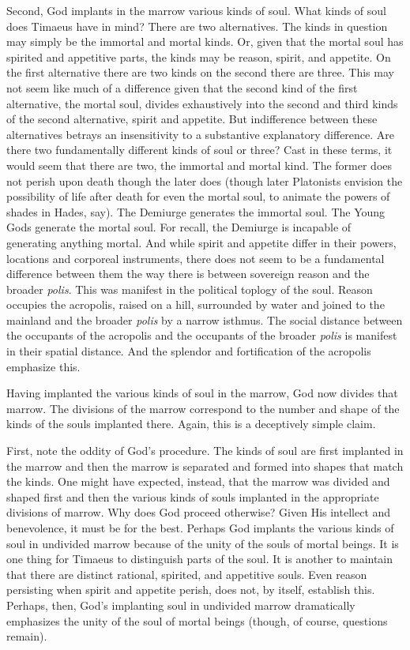 Second, God implants in the marrow various kinds of soul. What kinds of soul does Timaeus have in mind? There are two alternatives. The kinds in question may simply be the immortal and mortal kinds. Or, given that the mortal soul has spirited and appetitive parts, the kinds may be reason, spirit, and appetite. On the first alternative there are two kinds on the second there are three. This may not seem like much of a difference given that the second kind of the first alternative, the mortal soul, divides exhaustively into the second and third kinds of the second alternative, spirit and appetite. But indifference between these alternatives betrays an insensitivity to a substantive explanatory difference. Are there two fundamentally different kinds of soul or three? Cast in these terms, it would seem that there are two, the immortal and mortal kind. The former does not perish upon death though the later does (though later Platonists envision the possibility of life after death for even the mortal soul, to animate the powers of shades in Hades, say). The Demiurge generates the immortal soul. The Young Gods generate the mortal soul. For recall, the Demiurge is incapable of generating anything mortal. And while spirit and appetite differ in their powers, locations and corporeal instruments, there does not seem to be a fundamental difference between them the way there is between sovereign reason and the broader \emph{polis}. This was manifest in the political toplogy of the soul. Reason occupies the acropolis, raised on a hill, surrounded by water and joined to the mainland and the broader \emph{polis} by a narrow isthmus. The social distance between the occupants of the acropolis and the occupants of the broader \emph{polis} is manifest in their spatial distance. And the splendor and fortification of the acropolis emphasize this. 

Having implanted the various kinds of soul in the marrow, God now divides that marrow. The divisions of the marrow correspond to the number and shape of the kinds of the souls implanted there. Again, this is a deceptively simple claim.

First, note the oddity of God's procedure. The kinds of soul are first implanted in the marrow and then the marrow is separated and formed into shapes that match the kinds. One might have expected, instead, that the marrow was divided and shaped first and then the various kinds of souls implanted in the appropriate divisions of marrow. Why does God proceed otherwise? Given His intellect and benevolence, it must be for the best. Perhaps God implants the various kinds of soul in undivided marrow because of the unity of the souls of mortal beings. It is one thing for Timaeus to distinguish parts of the soul. It is another to maintain that there are distinct rational, spirited, and appetitive souls. Even reason persisting when spirit and appetite perish, does not, by itself, establish this. Perhaps, then, God's implanting soul in undivided marrow dramatically emphasizes the unity of the soul of mortal beings (though, of course, questions remain).

